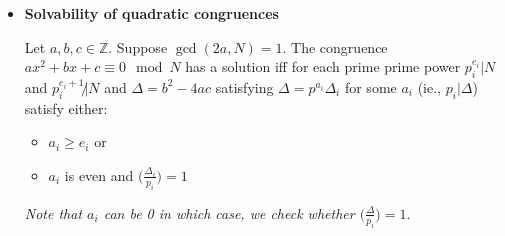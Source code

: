 \documentclass[a4paper, 12pt]
{article}
\newcommand{\ls}[2]{\bigg(\frac{#1}{#2}\bigg)}
\begin{document}
\begin{itemize}
	\begin{enumerate}
		\item  factorise $a$ into a product of primes $\pm \prod_ip_i^{e_i}.$
		\item Calculate $\ls{-1}{p}.$
		\item Calculate $\ls{p_i}{p}$ for all $i$
		\item Use property 2 of legendre symbols
		\item We can use:
		\begin{itemize}
		\item \begin{equation*}
			\ls{2}{p} =
			\begin{cases}
				1 & p \equiv 1,7\mod 8\\
				-1 & p \equiv 3,5 \mod 8
			\end{cases}
		\end{equation*}
		
		\item \begin{equation*}
			\ls{-1}{p} =
			\begin{cases}
				1 & p \equiv1 \mod 4\\
				-1 & p \equiv 3 \mod4
			\end{cases}
		\end{equation*}
		
		\item Quadratic Reciprocity
	\end{itemize}
	\end{enumerate}
	
	\item \textbf{Solvability of quadratic congruences}
	
	Let $a,b,c \in \mathbb{Z}.$ Suppose $\gcd(2a, N)=1.$ 
	The congruence $ax^2 +bx +c \equiv 0 \mod N$  has a solution iff for each prime prime power $p_i^{e_i}|N$ and $p_i^{e_i+1} \not | N$ and  $\Delta = b^2 -4ac$ satisfying  $\Delta = p^{a_i}\Delta_i$ for some $a_i$ (ie., $p_i| \Delta$) satisfy either:
		\begin{itemize}
			\item $a_i \geq e_i$ or
			\item $a_i$ is even and $\ls{\Delta_i}{p_i} = 1$
		\end{itemize}
		
		\textit{Note that $a_i$ can be 0 in which case, we check whether $\ls{\Delta}{p_i}=1.$}
		
	\end{itemize}
	
	\hfill
	
\end{document}

